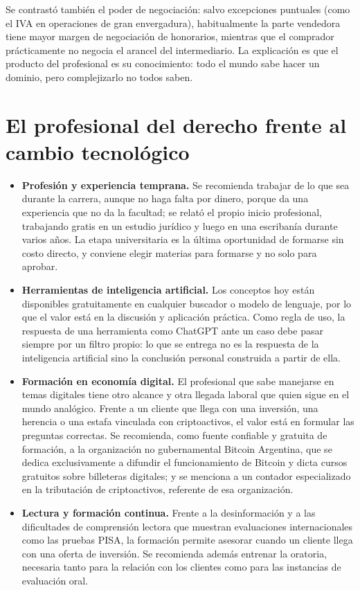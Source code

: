 \documentclass[12pt,oneside]{book}
\begin{document}
Se contrastó también el poder de negociación: salvo excepciones puntuales (como el IVA en operaciones de gran envergadura), habitualmente la parte vendedora tiene mayor margen de negociación de honorarios, mientras que el comprador prácticamente no negocia el arancel del intermediario. La explicación es que el producto del profesional es su conocimiento: todo el mundo sabe hacer un dominio, pero complejizarlo no todos saben.

\section{El profesional del derecho frente al cambio tecnológico}

\begin{itemize}
    \item \textbf{Profesión y experiencia temprana.} Se recomienda trabajar de lo que sea durante la carrera, aunque no haga falta por dinero, porque da una experiencia que no da la facultad; se relató el propio inicio profesional, trabajando gratis en un estudio jurídico y luego en una escribanía durante varios años. La etapa universitaria es la última oportunidad de formarse sin costo directo, y conviene elegir materias para formarse y no solo para aprobar.
    \item \textbf{Herramientas de inteligencia artificial.} Los conceptos hoy están disponibles gratuitamente en cualquier buscador o modelo de lenguaje, por lo que el valor está en la discusión y aplicación práctica. Como regla de uso, la respuesta de una herramienta como ChatGPT ante un caso debe pasar siempre por un filtro propio: lo que se entrega no es la respuesta de la inteligencia artificial sino la conclusión personal construida a partir de ella.
    \item \textbf{Formación en economía digital.} El profesional que sabe manejarse en temas digitales tiene otro alcance y otra llegada laboral que quien sigue en el mundo analógico. Frente a un cliente que llega con una inversión, una herencia o una estafa vinculada con criptoactivos, el valor está en formular las preguntas correctas. Se recomienda, como fuente confiable y gratuita de formación, a la organización no gubernamental Bitcoin Argentina, que se dedica exclusivamente a difundir el funcionamiento de Bitcoin y dicta cursos gratuitos sobre billeteras digitales; y se menciona a un contador especializado en la tributación de criptoactivos, referente de esa organización.
    \item \textbf{Lectura y formación continua.} Frente a la desinformación y a las dificultades de comprensión lectora que muestran evaluaciones internacionales como las pruebas PISA, la formación permite asesorar cuando un cliente llega con una oferta de inversión. Se recomienda además entrenar la oratoria, necesaria tanto para la relación con los clientes como para las instancias de evaluación oral.
\end{itemize}
\end{document}
